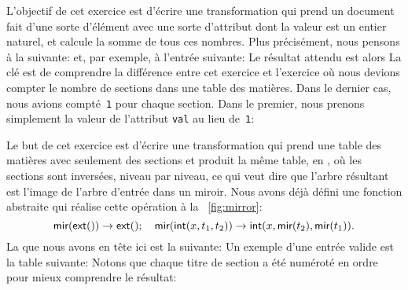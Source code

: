 
\hspace*{-3pt} L'objectif de cet exercice est d'écrire une
transformation \XSLT qui prend un document fait d'une sorte d'élément
avec une sorte d'attribut dont la valeur est un entier naturel, et
calcule la somme de tous ces nombres. Plus précisément, nous pensons à
la \DTD suivante: 
\noindent et, par exemple, à l'entrée suivante:
\noindent Le résultat attendu est alors
{\small} La clé est de comprendre
la différence entre cet exercice et l'exercice où nous devions compter
le nombre de sections dans une table des matières. Dans le dernier
cas, nous avions compté~\texttt{1} pour chaque section. Dans le
premier, nous prenons simplement la valeur de l'attribut \texttt{val}
au lieu de~\texttt{1}: 


Le but de cet exercice est d'écrire une transformation \XSLT qui prend
une table des matières avec seulement des sections et produit la même
table, en \XML, où les sections sont inversées, niveau par niveau, ce
qui veut dire que l'arbre résultant est l'image de l'arbre d'entrée
dans un miroir. Nous avons déjà défini une fonction abstraite
 qui réalise cette opération à la \fig~\vref{fig:mirror}:
\begin{equation*}
\textsf{mir}(\textsf{ext}()) \rightarrow \textsf{ext}();
\quad
\textsf{mir}(\textsf{int}(x,t_1,t_2)) \rightarrow
\textsf{int}(x,\textsf{mir}(t_2),\textsf{mir}(t_1)).
\end{equation*}
\noindent La \DTD que nous avons en tête ici est la suivante:
\noindent Un exemple d'une entrée valide est la table suivante:
\noindent Notons que chaque titre de section a été numéroté en ordre
pour mieux comprendre le résultat:

